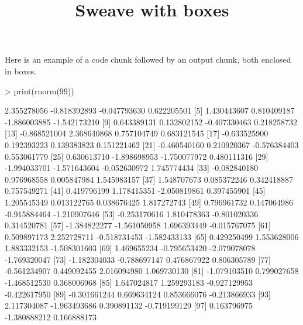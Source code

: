 \documentclass[a4paper]{article}
\title{Sweave with boxes}
\begin{document}

\maketitle


Here is an example of a code chunk followed by an output chunk,
both enclosed in boxes.

\begin{Schunk}
\begin{Sinput}
> print(rnorm(99))
\end{Sinput}
\begin{Soutput}
 [1]  2.355278056 -0.818392893 -0.047793630  0.622205501
 [5]  1.430443607  0.810409187 -1.886003885 -1.542173210
 [9]  0.643389131  0.132802152 -0.407330463  0.218258732
[13] -0.868521004  2.368640868  0.757104749  0.683121545
[17] -0.633525900  0.192393223  0.139383823  0.151221462
[21] -0.460540160  0.210920367 -0.576384403  0.553061779
[25]  0.630613710 -1.898698953 -1.750077972  0.480111316
[29] -1.994033701 -1.571643604 -0.052630972  1.745774434
[33] -0.082840180  0.976968558  0.005847984  1.545983157
[37]  1.548707673  0.085372246  0.342418887  0.757549271
[41]  0.419796199  1.178415351 -2.050819861  0.397455901
[45]  1.205545349  0.013122765  0.038676425  1.817272743
[49]  0.796961732  0.147064986 -0.915884464 -1.210907646
[53] -0.253170616  1.810478363 -0.801020336  0.314520781
[57] -1.384822277 -1.561050958  1.696393449 -0.015767075
[61]  0.509897173  2.252728711 -0.518731453 -1.582433133
[65]  0.429250499  1.553628006  1.883332153 -1.508301603
[69]  1.469655234 -0.795653420 -2.079078078 -1.769320047
[73] -1.182304033 -0.788697147  0.476867922  0.806305789
[77] -0.561234907  0.449092455  2.016094980  1.069730130
[81] -1.079103510  0.799027658 -1.468512530  0.368006968
[85]  1.647024817  1.259293183 -0.927129953 -0.422617950
[89] -0.301661244  0.669634124  0.853666076 -0.213866933
[93]  2.117304087 -1.963493686  0.390891132 -0.719199129
[97]  0.163796975 -1.380888212  0.166888173
\end{Soutput}
\end{Schunk}
\end{document}
